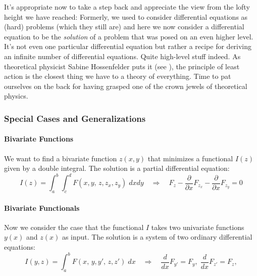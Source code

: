 

\medskip
It's appropriate now to take a step back and appreciate the view from the lofty height we have reached:  Formerly, we used to consider differential equations as (hard) problems (which they still are) and here we now consider a differential equation to be the \emph{solution} of a problem that was posed on an even higher level. It's not even one particular differential equation but rather a recipe for deriving an infinite number of differential equations. Quite high-level stuff indeed. As theoretical physicist Sabine Hossenfelder puts it (see \cite{YT_LeastAction}), the principle of least action is the closest thing we have to a theory of everything. Time to pat ourselves on the back for having grasped one of the crown jewels of theoretical physics. 




\subsubsection{Special Cases and Generalizations}


\paragraph{Bivariate Functions} We want to find a bivariate function $z(x,y)$ that minimizes a functional $I(z)$ given by a double integral. The solution is a partial differential equation:
\begin{equation}
 I(z) = \int_a^b \int_c^d  F(x,y, \, z,z_x,z_y ) \; dx dy
 \quad \Rightarrow \quad
  F_z - \frac{\partial}{\partial x} F_{z_x} - \frac{\partial}{\partial x} F_{z_y} = 0
\end{equation}

\paragraph{Bivariate Functionals} Now we consider the case that the functional $I$ takes two univariate functions $y(x)$ and $z(x)$ as input. The solution is a system of two ordinary differential equations:
\begin{equation}
 I(y,z) = \int_a^b F(x, \, y,y', \, z,z') \; dx
 \quad \Rightarrow \quad
 \frac{d}{d x} F_{y'} = F_y, \;  \frac{d}{d x} F_{z'} = F_z,
\end{equation}


